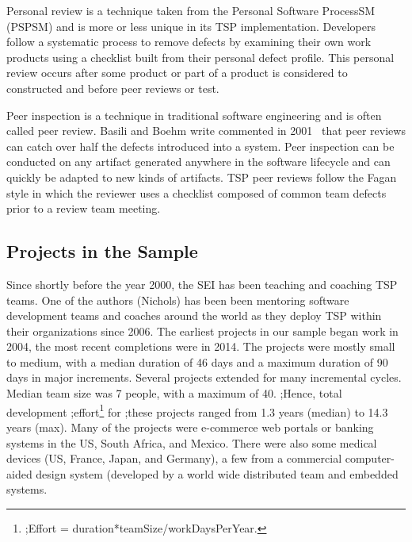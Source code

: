 Personal review is a technique taken  from the Personal Software
ProcessSM (PSPSM) and is more or less unique in its TSP implementation.  Developers follow a systematic process to remove defects by  examining their own work products using a checklist built from their personal defect profile. This personal review occurs after some product or part of a product is considered to constructed and before peer reviews or test. 

  
 
Peer inspection is a  technique in
traditional software engineering and is often called peer review.
 Basili and Boehm write  commented in 2001~\cite{boehm01} 
that peer reviews can catch over half the defects introduced into a system.
Peer inspection can be conducted on any artifact generated anywhere in the software
lifecycle and can quickly be adapted to new kinds of artifacts. TSP peer reviews follow the Fagan style in which the reviewer uses a checklist composed of common team defects prior to a review team meeting. 




\subsection{Projects in the Sample}
Since shortly before the year 2000, the SEI has been teaching and coaching TSP teams. One of the authors (Nichols) has been been mentoring software development teams and coaches around the world as they deploy TSP within their organizations since 2006.  The earliest projects in our sample began work in 2004, the most recent completions were in 2014.
The projects
were mostly small to medium, with a median duration of 46 days
and a maximum duration of 90 days in major increments. Several projects extended for many incremental cycles. Median team size was 7
people, with a maximum of 40. 
;Hence,  total development 
;effort\footnote{
;Effort =  duration*teamSize/workDaysPerYear.} for
;these projects ranged from 1.3 years (median) to 14.3 years (max).
Many of
the projects were e-commerce web portals or banking systems in the US, South Africa, and Mexico. 
There were also some  medical devices (US, France, Japan, and Germany),  a few from a commercial 
computer-aided design system (developed by a world wide distributed team and embedded systems. 

